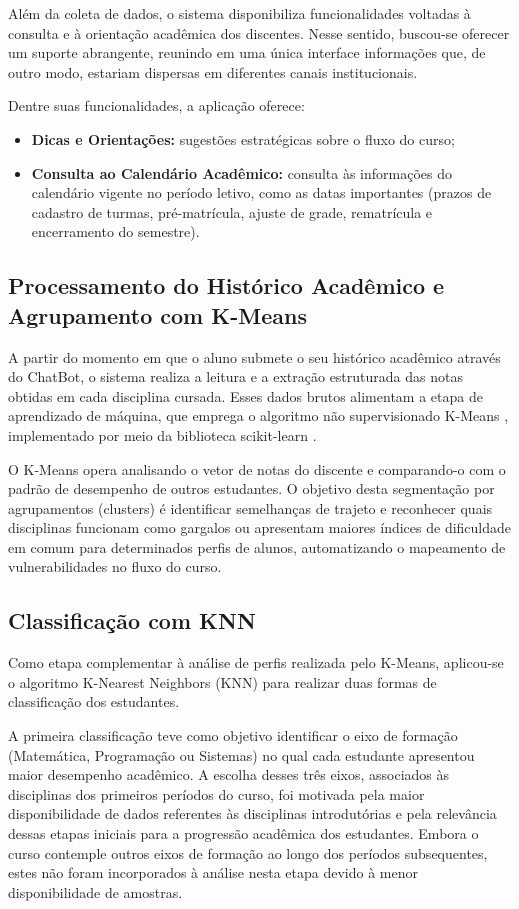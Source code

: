 Além da coleta de dados, o sistema disponibiliza funcionalidades voltadas à consulta e à orientação acadêmica dos discentes. Nesse sentido, buscou-se oferecer um suporte abrangente, reunindo em uma única interface informações que, de outro modo, estariam dispersas em diferentes canais institucionais.

Dentre suas funcionalidades, a aplicação oferece:
\begin{itemize} 
    \item \textbf{Dicas e Orientações:} sugestões estratégicas sobre o fluxo do curso;
    \item \textbf{Consulta ao Calendário Acadêmico:} consulta às informações do calendário vigente no período letivo, como as datas importantes (prazos de cadastro de turmas, pré-matrícula, ajuste de grade, rematrícula e encerramento do semestre).
\end{itemize}

\subsection{Processamento do Histórico Acadêmico e Agrupamento com K-Means}
A partir do momento em que o aluno submete o seu histórico acadêmico através do ChatBot, o sistema realiza a leitura e a extração estruturada das notas obtidas em cada disciplina cursada. Esses dados brutos alimentam a etapa de aprendizado de máquina, que emprega o algoritmo não supervisionado K-Means \citep{huberty2005cluster}, implementado por meio da biblioteca scikit-learn \citep{pedregosa2011scikit}.

O K-Means opera analisando o vetor de notas do discente e comparando-o com o padrão de desempenho de outros estudantes. O objetivo desta segmentação por agrupamentos (clusters) é identificar semelhanças de trajeto e reconhecer quais disciplinas funcionam como gargalos ou apresentam maiores índices de dificuldade em comum para determinados perfis de alunos, automatizando o mapeamento de vulnerabilidades no fluxo do curso.

\subsection{Classificação com KNN}

Como etapa complementar à análise de perfis realizada pelo K-Means, aplicou-se o algoritmo K-Nearest Neighbors (KNN) para realizar duas formas de classificação dos estudantes.

A primeira classificação teve como objetivo identificar o eixo de formação (Matemática, Programação ou Sistemas) no qual cada estudante apresentou maior desempenho acadêmico. A escolha desses três eixos, associados às disciplinas dos primeiros períodos do curso, foi motivada pela maior disponibilidade de dados referentes às disciplinas introdutórias e pela relevância dessas etapas iniciais para a progressão acadêmica dos estudantes. Embora o curso contemple outros eixos de formação ao longo dos períodos subsequentes, estes não foram incorporados à análise nesta etapa devido à menor disponibilidade de amostras.

